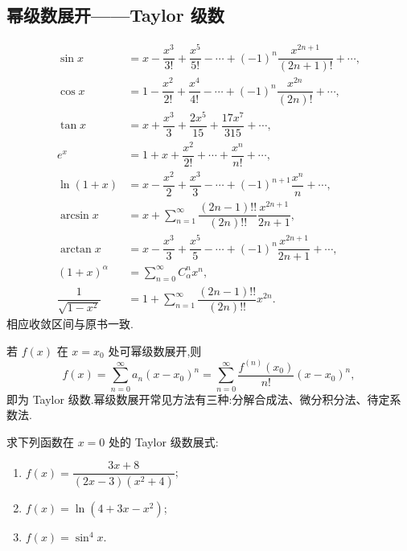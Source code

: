 \documentclass[../数学分析培优讲义.tex]{subfiles}
\begin{document}
\newpage

\subsection{幂级数展开——Taylor 级数}

\begin{theorem}
\begin{align*}
    \sin x&=x-\dfrac{x^3}{3!}+\dfrac{x^5}{5!}-\cdots+(-1)^n\dfrac{x^{2n+1}}{(2n+1)!}+\cdots,\\
    \cos x&=1-\dfrac{x^2}{2!}+\dfrac{x^4}{4!}-\cdots+(-1)^n\dfrac{x^{2n}}{(2n)!}+\cdots,\\
    \tan x&=x+\dfrac{x^3}{3}+\dfrac{2x^5}{15}+\dfrac{17x^7}{315}+\cdots,\\
    e^x&=1+x+\dfrac{x^2}{2!}+\cdots+\dfrac{x^n}{n!}+\cdots,\\
    \ln(1+x)&=x-\dfrac{x^2}{2}+\dfrac{x^3}{3}-\cdots+(-1)^{n+1}\dfrac{x^n}{n}+\cdots,\\
    \arcsin x&=x+\sum\limits_{n=1}^{\infty}\dfrac{(2n-1)!!}{(2n)!!}\dfrac{x^{2n+1}}{2n+1},\\
    \arctan x&=x-\dfrac{x^3}{3}+\dfrac{x^5}{5}-\cdots+(-1)^n\dfrac{x^{2n+1}}{2n+1}+\cdots,\\
    (1+x)^\alpha&=\sum\limits_{n=0}^{\infty}C_{\alpha}^{n}x^n,\\
    \dfrac{1}{\sqrt{1-x^2}}&=1+\sum\limits_{n=1}^{\infty}\dfrac{(2n-1)!!}{(2n)!!}x^{2n}.
\end{align*}
相应收敛区间与原书一致.
\end{theorem}

\begin{remark}
若 $f(x)$ 在 $x=x_0$ 处可幂级数展开,则
\[
    f(x)=\sum\limits_{n=0}^{\infty}a_n(x-x_0)^n
    =\sum\limits_{n=0}^{\infty}\dfrac{f^{(n)}(x_0)}{n!}(x-x_0)^n,
\]
即为 Taylor 级数.幂级数展开常见方法有三种:分解合成法、微分积分法、待定系数法.
\end{remark}

\begin{example}
求下列函数在 $x=0$ 处的 Taylor 级数展式:
\begin{enumerate}[label=(\arabic*)]
    \item $f(x)=\dfrac{3x+8}{(2x-3)(x^2+4)}$;
    \item $f(x)=\ln(4+3x-x^2)$;
    \item $f(x)=\sin^4x$.
\end{enumerate}
\end{example}
\exampleblank
\end{document}
